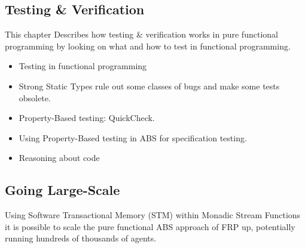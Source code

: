 
\subsection{Testing \& Verification}
This chapter Describes how testing \& verification works in pure functional programming by looking on what and how to test in functional programming.
\begin{itemize}
	\item Testing in functional programming
	\item Strong Static Types rule out some classes of bugs and make some tests obsolete.
	\item Property-Based testing: QuickCheck.
	\item Using Property-Based testing in ABS for specification testing.
	\item Reasoning about code
\end{itemize}


\subsection{Going Large-Scale}
Using Software Transactional Memory (STM) within Monadic Stream Functions it is possible to scale the pure functional ABS approach of FRP up, potentially running hundreds of thousands of agents.

